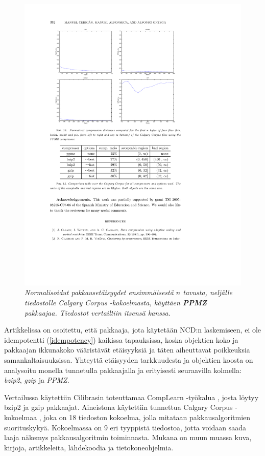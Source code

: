 \documentclass[12pt,finnish]{tktltiki2}
\theoremstyle{definition}
\theoremstyle{remark}
\begin{document}
    \begin{figure}[tb]
        \immediate{}
      \includegraphics{img/ppmz}
      \caption{\emph{Normalisoidut pakkausetäisyydet ensimmäisestä $n$ tavusta, neljälle tiedostolle Calgary Corpus -kokoelmasta, käyttäen \textbf{PPMZ} pakkaajaa. Tiedostot vertailtiin itsensä kanssa.} \cite{cebrian2005common}}
      \label{fig:ppmz}
    \end{figure}

      Artikkelissa \cite{cebrian2005common} on osoitettu, että pakkaaja, jota käytetään NCD:n laskemiseen, ei ole idempotentti (\ref{idempotency}) kaikissa tapauksissa, koska objektien koko ja pakkaajan ikkunakoko vääristävät etäisyyksiä ja täten aiheuttavat poikkeuksia samankaltaisuuksissa. Yhteyttä etäisyyden tarkkuudesta ja objektien koosta on analysoitu monella tunnetulla pakkaajalla ja erityisesti seuraavilla kolmella:  \emph{bzip2}, \emph{gzip} ja \emph{PPMZ}.

      Vertailussa käytettiin Cilibrasin toteuttamaa CompLearn -työkalua \cite{complearn}, josta löytyy bzip2 ja gzip pakkaajat.
      Aineistona käytettiin tunnettua Calgary Corpus -kokoelmaa \cite{calgarycorpus}, joka on 18 tiedoston kokoelma, jolla mitataan pakkausalgoritmien suorituskykyä.
      Kokoelmassa on 9 eri tyyppistä tiedostoa, jotta voidaan saada laaja näkemys pakkausalgoritmin toiminnasta.
      Mukana on muun muassa kuva, kirjoja, artikkeleita, lähdekoodia ja tietokoneohjelmia.
\end{document}
